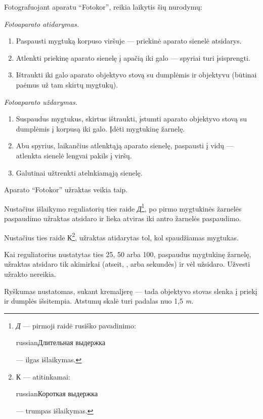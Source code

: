 \documentclass[12pt]{book}
\begin{document}
			Fotografuojant aparatu ``Fotokor'', reikia laikytis šių nurodymų:

			\textit{Fotoaparato atidarymas.}
			\begin{enumerate}
				\item Paspausti mygtuką korpuso viršuje --- priekinė aparato sienelė atsidarys.
				\item Atlenkti priekinę aparato sienelę į apačią iki galo --- spyriai turi įsisprengti.
				\item Ištraukti iki galo aparato objektyvo stovą su dumplėmis ir objektyvu (būtinai paėmus už tam skirtų mygtukų).
			\end{enumerate}

			\textit{Fotoaparato uždarymas.}
			\begin{enumerate}
				\item Suspaudus mygtukus, skirtus ištraukti, įstumti aparato objektyvo stovą su dumplėmis į korpusą iki galo. Įdėti mygtukinę žarnelę.
				\item Abu spyrius, laikančius atlenktąją aparato sienelę, paspausti į vidų --- atlenkta sienelė lengvai pakils į viršų.
				\item Galutinai užtrenkti atelnkiamąją sienelę.
			\end{enumerate}

			Aparato ``Fotokor'' užraktas veikia taip.

			Nustačius išlaikymo reguliatorių ties raide \textit{\foreignlanguage{russian}{Д}}\footnote{\textit{\foreignlanguage{russian}{Д}} --- pirmoji raidė rusiško pavadinimo: \begin{otherlanguage*}{russian}Длительная выдержка\end{otherlanguage*} --- ilgas išlaikymas.}, po pirmo mygtukinės žarnelės paspaudimo užraktas atsidaro ir lieka atviras iki antro žarnelės paspaudimo.

			Nustačius ties raide \foreignlanguage{russian}{К}\footnote{\foreignlanguage{russian}{К} --- atitinkamai: \begin{otherlanguage*}{russian}Короткая выдержка\end{otherlanguage*} --- trumpas išlaikymas.}, užraktas atidarytas tol, kol spaudžiamas mygtukas.

			Kai reguliatorius nustatytas ties 25, 50 arba 100, paspaudus mygtukinę žarnelę, užraktas atsidaro tik akimirkai (atseit, ,  arba  sekundės) ir vėl užsidaro. Užvesti užrakto nereikia.

			Ryškumas nustatomas, sukant kremaljerę --- tada objektyvo stovas slenka į priekį ir dumplės išsitempia. Atstumų skalė turi padalas nuo 1,5 \textit{m}.
\end{document}
